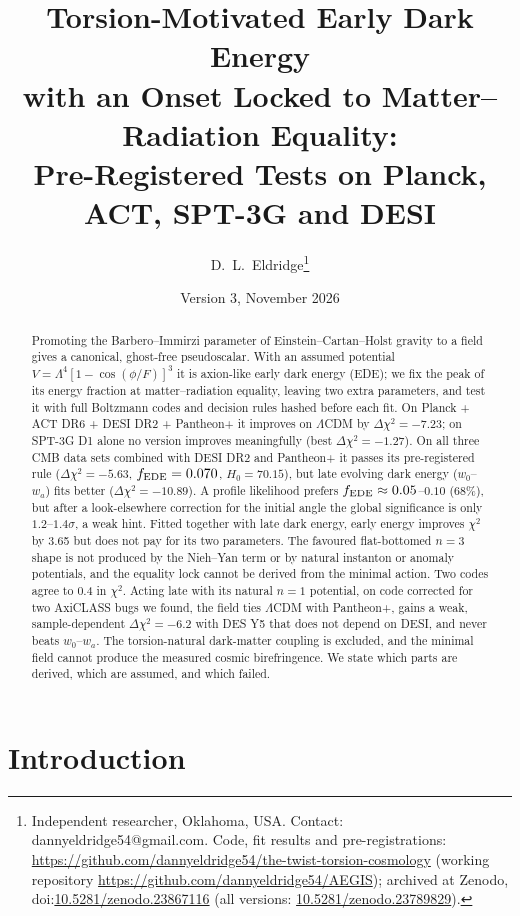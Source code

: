 \documentclass[11pt]{article}
\title{\textbf{Torsion-Motivated Early Dark Energy\\ with an Onset Locked to Matter--Radiation Equality:\\
Pre-Registered Tests on Planck, ACT, SPT-3G and DESI}}
\author{D.~L.~Eldridge\thanks{Independent researcher, Oklahoma, USA. Contact: dannyeldridge54@gmail.com.
Code, fit results and pre-registrations: \url{https://github.com/dannyeldridge54/the-twist-torsion-cosmology}
(working repository \url{https://github.com/dannyeldridge54/AEGIS}); archived at Zenodo, doi:\href{https://doi.org/10.5281/zenodo.23867116}{10.5281/zenodo.23867116} (all versions: \href{https://doi.org/10.5281/zenodo.23789829}{10.5281/zenodo.23789829}).}}
\date{Version 3, November 2026}
\begin{document}
\maketitle

\begin{abstract}
Promoting the Barbero--Immirzi parameter of Einstein--Cartan--Holst gravity to a field gives a
canonical, ghost-free pseudoscalar. With an assumed potential $V=\Lambda^4[1-\cos(\phi/F)]^3$ it is
axion-like early dark energy (EDE); we fix the peak of its energy fraction at matter--radiation
equality, leaving two extra parameters, and test it with full Boltzmann codes and decision rules hashed
before each fit. On Planck + ACT DR6 + DESI DR2 + Pantheon+ it improves on $\Lambda$CDM by
$\Delta\chi^2=-7.23$; on SPT-3G D1 alone no version improves meaningfully (best $\Delta\chi^2=-1.27$). On all three CMB
data sets combined with DESI DR2 and Pantheon+ it passes its pre-registered rule ($\Delta\chi^2=-5.63$,
$f_{\rm EDE}=0.070$, $H_0=70.15$), but late evolving dark energy ($w_0$--$w_a$) fits better
($\Delta\chi^2=-10.89$). A profile likelihood prefers $f_{\rm EDE}\approx0.05$--$0.10$
(68\%), but after a look-elsewhere correction for the initial angle the global significance is only
$1.2$--$1.4\sigma$, a weak hint. Fitted together with late dark energy, early energy improves $\chi^2$ by 3.65 but
does not pay for its two parameters. The favoured flat-bottomed $n=3$ shape is not produced by the Nieh--Yan term
or by natural instanton or anomaly potentials, and the equality lock cannot be derived from the minimal action. Two
codes agree to 0.4 in $\chi^2$. Acting late with its
natural $n=1$ potential, on code corrected for two AxiCLASS bugs we found, the field ties $\Lambda$CDM with Pantheon+,
gains a weak, sample-dependent $\Delta\chi^2=-6.2$ with DES Y5 that does not depend on DESI, and never beats
$w_0$--$w_a$. The torsion-natural
dark-matter coupling is excluded, and the minimal field cannot produce the measured cosmic birefringence. We state
which parts are derived, which are assumed, and which failed.
\end{abstract}

\tableofcontents

\section{Introduction}\label{sec:intro}
\end{document}
